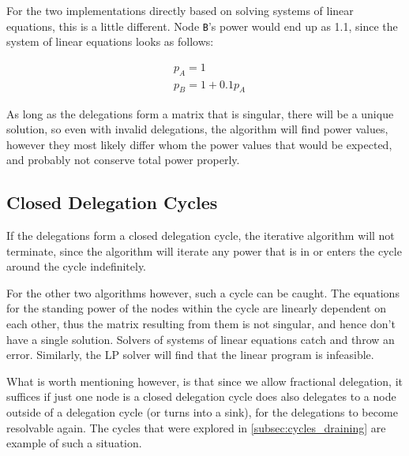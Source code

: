 For the two implementations directly based on solving systems of linear equations, this is a little different. Node \texttt{B}'s power would end up as 1.1, since the system of linear equations looks as follows:

\begin{align*}
& p_A = 1 \\
& p_B = 1 + 0.1p_A
\end{align*}

As long as the delegations form a matrix that is singular, there will be a unique solution, so even with invalid delegations, the algorithm will find power values, however they most likely differ whom the power values that would be expected, and probably not conserve total power properly. 

\subsection{Closed Delegation Cycles}

If the delegations form a closed delegation cycle, the iterative algorithm will not terminate, since the algorithm will iterate any power that is in or enters the cycle around the cycle indefinitely. 

For the other two algorithms however, such a cycle can be caught. The equations for the standing power of the nodes within the cycle are linearly dependent on each other, thus the matrix resulting from them is not singular, and hence don't have a single solution. Solvers of systems of linear equations catch and throw an error. Similarly, the LP solver will find that the linear program is infeasible.

What is worth mentioning however, is that since we allow fractional delegation, it suffices if just one node is a closed delegation cycle does also delegates to a node outside of a delegation cycle (or turns into a sink), for the delegations to become resolvable again. The cycles that were explored in \cref{subsec:cycles_draining} are example of such a situation. 


